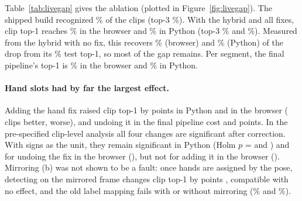 

Table~\ref{tab:livegap} gives the ablation (plotted in Figure~\ref{fig:livegap}). The
shipped build recognized \% of the clips (top-3 \%). With
the hybrid and all fixes, clip top-1 reaches \% 
in the browser and \%  in Python (top-3
\% and \%). Measured from the hybrid with no fix,
this recovers \% (browser) and \% (Python) of the drop from its
\% test top-1, so most of the gap remains. Per segment, the final pipeline's top-1 is
\% in the browser and \% in Python.

\paragraph{Hand slots had by far the largest effect.}
Adding the hand fix raised clip top-1 by  points in Python and
 in the browser ( clips better,
 worse), and undoing it in the final pipeline cost
 and  points. In the pre-specified clip-level analysis
all four changes are significant after correction. With signs as the unit, they remain significant
in Python (Holm $p$ =  and ) and for undoing
the fix in the browser (), but not for adding it in the browser
(). Mirroring (b) was not shown to be a fault: once hands are
assigned by the pose, detecting on the mirrored frame changes clip top-1 by
 points , compatible with no effect, and the
old label mapping fails with or without mirroring (\% and
\%).

